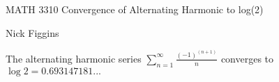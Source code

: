 \documentclass{article}
\newenvironment{claim}[2][Claim]{\begin{trivlist}
\item[\hskip \labelsep {\bfseries #1}\hskip \labelsep {\bfseries #2.}]}{\end{trivlist}}
\begin{document}
\large %
\linespread{1.5} %


{\Large MATH 3310 %
\hfill  Convergence of Alternating Harmonic to log(2)}

\begin{center}
{\Large Nick Figgins} %
\end{center}
\vspace{0.05in}

%

\begin{claim}{}
The alternating harmonic series $\sum_{n=1}^{\infty} \frac{(-1)^{(n+1)}}{n} $ converges to $\log{2} = 0.693147181...$ 
\end{claim}
\end{document}
